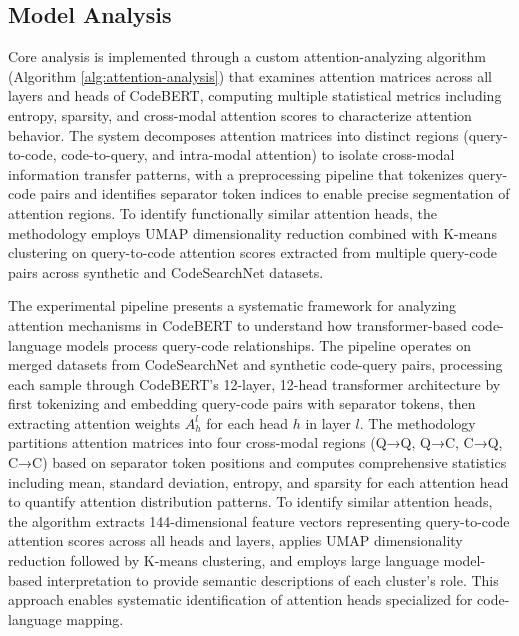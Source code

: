 \documentclass[conference]{IEEEtran}
\begin{document}
\subsection{Model Analysis}

Core analysis is implemented through a custom attention-analyzing algorithm (Algorithm \ref{alg:attention-analysis}) that examines attention matrices across all layers and heads of CodeBERT, computing multiple statistical metrics including entropy, sparsity, and cross-modal attention scores to characterize attention behavior. The system decomposes attention matrices into distinct regions (query-to-code, code-to-query, and intra-modal attention) to isolate cross-modal information transfer patterns, with a preprocessing pipeline that tokenizes query-code pairs and identifies separator token indices to enable precise segmentation of attention regions. To identify functionally similar attention heads, the methodology employs UMAP dimensionality reduction combined with K-means clustering on query-to-code attention scores extracted from multiple query-code pairs across synthetic and CodeSearchNet datasets.

The experimental pipeline presents a systematic framework for analyzing attention mechanisms in CodeBERT to understand how transformer-based code-language models process query-code relationships. The pipeline operates on merged datasets from CodeSearchNet and synthetic code-query pairs, processing each sample through CodeBERT's 12-layer, 12-head transformer architecture by first tokenizing and embedding query-code pairs with separator tokens, then extracting attention weights $A_h^l$ for each head $h$ in layer $l$. The methodology partitions attention matrices into four cross-modal regions (Q→Q, Q→C, C→Q, C→C) based on separator token positions and computes comprehensive statistics including mean, standard deviation, entropy, and sparsity for each attention head to quantify attention distribution patterns. To identify similar attention heads, the algorithm extracts 144-dimensional feature vectors representing query-to-code attention scores across all heads and layers, applies UMAP dimensionality reduction followed by K-means clustering, and employs large language model-based interpretation to provide semantic descriptions of each cluster's role. This approach enables systematic identification of attention heads specialized for code-language mapping.
\end{document}
